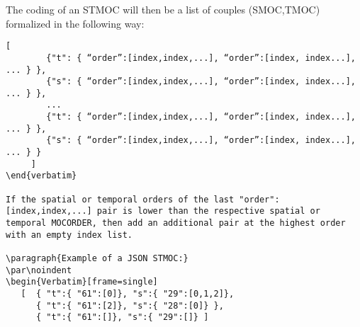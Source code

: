 The coding of an STMOC will then be a list of couples (SMOC,TMOC) formalized in the following way:
\par\noindent
\begin{Verbatim}[frame=single, xrightmargin=-3cm] 
     [
        {"t": { “order”:[index,index,...], “order”:[index, index...], ... } },
        {"s": { “order”:[index,index,...], “order”:[index, index...], ... } },
        ...
        {"t": { “order”:[index,index,...], “order”:[index, index...], ... } },
        {"s": { “order”:[index,index,...], “order”:[index, index...], ... } }
     ]
\end{verbatim}

If the spatial or temporal orders of the last "order":[index,index,...] pair is lower than the respective spatial or temporal MOCORDER, then add an additional pair at the highest order with an empty index list.

\paragraph{Example of a JSON STMOC:}
\par\noindent
\begin{Verbatim}[frame=single]
   [  { "t":{ "61":[0]}, "s":{ "29":[0,1,2]},
      { "t":{ "61":[2]}, "s":{ "28":[0]} },
      { "t":{ "61":[]}, "s":{ "29":[]} ]
\end{Verbatim}

